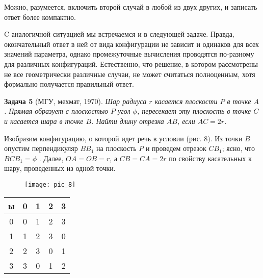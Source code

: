 Можно, разумеется, включить второй случай в любой из двух других, и записать ответ более компактно.

C аналогичной ситуацией мы встречаемся и в следующей задаче. Правда, окончательный ответ в ней от вида конфигурации не зависит и одинаков для всех значений параметра, однако промежуточные вычисления проводятся по-разному для различных конфигураций. Естественно, что решение, в котором рассмотрены не все геометрически различные случаи, не может считаться полноценным, хотя формально получается правильный ответ.


\textbf{Задача 5} (МГУ, мехмат, 1970). \textit{Шар радиуса $r$ касается плоскости $P$ в точке $A$. Прямая образует с плоскостью $P$ угол $\phi$, пересекает эту плоскость в точке $C$ и касается шара в точке $B$. Найти длину отрезка $AB$, если $AC = 2r$.}


Изобразим конфигурацию, о которой идет речь в условии (рис. 8). Из точки $B$ опустим перпендикуляр $BB_1$ на плоскость $P$ и проведем отрезок $CB_1$; ясно, что $BCB_1 = \phi$ . Далее, $OA = OB = r$, а $CB = CA =2r$ по свойству касательных к шару, проведенных из одной точки. 
\begin{figure}[h]
	\centering
	\texttt{[image: pic\_8]}
	\caption{}
	\label{fig:circle}
\end{figure}
\newpage



\begin{tabular}{|c|c|c|c|c|}
\hline
ы & 0 & 1 & 2 & 3 \\
\hline
0 & 0 & 1 & 2 & 3 \\
\hline
1 & 1 & 2 & 3 & 0 \\
\hline
2 & 2 & 3 & 0 & 1 \\
\hline
3 & 3 & 0 & 1 & 2 \\
\hline
\end{tabular}
